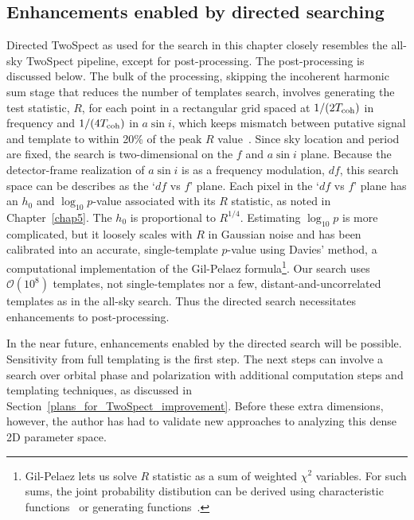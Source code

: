 
            \subsection{Enhancements enabled by directed searching}
            \label{directed_enhancements}

Directed TwoSpect as used for the search in this chapter closely resembles the all-sky TwoSpect pipeline, except for post-processing. 
The post-processing is discussed below.
The bulk of the processing, skipping the incoherent harmonic sum stage that reduces the number of templates search, involves generating the test statistic, $R$, for each point in a rectangular grid spaced at $1/(2T_\textup{coh})$ in frequency and $1/(4T_\textup{coh})$ in $a \sin i$, which keeps mismatch between putative signal and template to within 20\% of the peak $R$ value~\cite{GoetzTwoSpectMethods2011}.
Since sky location and period are fixed, the search is two-dimensional on the $f$ and $a \sin i$ plane. 
Because the detector-frame realization of $a \sin i$ is as a frequency modulation, $df$, this search space can be describes as the `$df$ vs $f$' plane.
Each pixel in the `$df$ vs $f$' plane has an $h_0$ and $\log_{10} p$-value associated with its $R$ statistic, as noted in Chapter~\ref{chap5}.
The $h_0$ is proportional to $R^{1/4}$.
Estimating $\log_{10} p$ is more complicated, but it loosely scales with $R$ in Gaussian noise and has been calibrated into an accurate, single-template $p$-value using Davies' method, a computational implementation of the Gil-Pelaez formula\footnote{Gil-Pelaez lets us solve $R$ statistic as a sum of weighted $\chi^2$ variables. For such sums, the joint probability distibution can be derived using characteristic functions~\cite{GoetzThesis} or generating functions~\cite{RomeroThesis}.}.
Our search uses $\mathcal{O}(10^8)$ templates, not single-templates nor a few, distant-and-uncorrelated templates as in the all-sky search.
Thus the directed search necessitates enhancements to post-processing.

In the near future, enhancements enabled by the directed search will be possible.
Sensitivity from full templating is the first step.
The next steps can involve a search over orbital phase and polarization with additional computation steps and templating techniques, as discussed in Section~\ref{plans_for_TwoSpect_improvement}.
Before these extra dimensions, however, the author has had to validate new approaches to analyzing this dense 2D parameter space.


